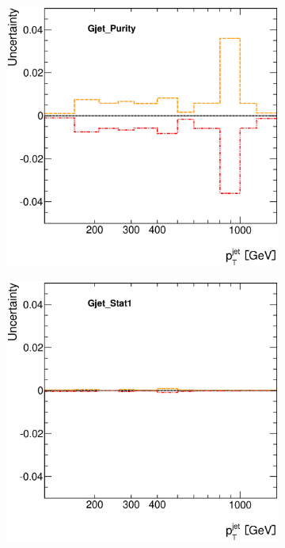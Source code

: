 \documentclass[12pt, twoside]{article}
\numberwithin{equation}{section}
\numberwithin{figure}{section}
\newenvironment{changemargin}[2]{%
\begin{list}{}{%
\setlength{\topsep}{0pt}%
\setlength{\leftmargin}{#1}%
\setlength{\rightmargin}{#2}%
\setlength{\listparindent}{\parindent}%
\setlength{\itemindent}{\parindent}%
\setlength{\parsep}{\parskip}%
}%
\item[]}{\end{list}}
\begin{document}
\begin{figure}[H]
\begin{changemargin}{-1.0cm}{-0.75cm}
\begin{changemargin}{-0.75cm}{-1.0cm}
        \begin{subfigure}[b]{0.25\textwidth}
            \includegraphics[width=\textwidth]{./images/JetSystematics/JetSystematic-9.eps}
        \end{subfigure}
        \begin{subfigure}[b]{0.25\textwidth}
            \includegraphics[width=\textwidth]{./images/JetSystematics/JetSystematic-10.eps}

\end{subfigure}
\end{changemargin}
\end{changemargin}
\end{figure}
\end{document}
